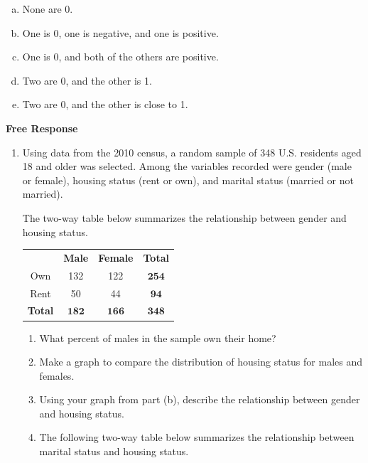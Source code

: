 \documentclass[a4paper,12pt,twoside]{book}
\begin{document}
\begin{enumerate}
        \begin{enumerate}[(a)]
            \item None are 0.
            \item One is 0, one is negative, and one is positive.
            \item One is 0, and both of the others are positive.
            \item Two are 0, and the other is 1.
            \item Two are 0, and the other is close to 1.
        \end{enumerate}
   \end{enumerate}
        \newpage    

    
    

\textbf{Free Response}

    \begin{enumerate}
        \item Using data from the 2010 census, a random sample of 348 U.S. residents aged 18 and older was selected. Among the variables recorded were gender (male or female), housing status (rent or own), and marital status (married or not married). 
        
        The two-way table below summarizes the relationship between gender and housing status.
        
        \begin{table}[H]
            \centering
            \begin{tabular}{cccc}
            \hline
            &\textbf{Male}&\textbf{Female}&\textbf{Total}\\
            Own&132&122&$\mathbf{254}$\\
            Rent&50&44&$\mathbf{94}$\\
            \textbf{Total}&$\mathbf{182}$&$\mathbf{166}$&$\mathbf{348}$\\
            \hline          
            \end{tabular}
        \end{table}
    
      \begin{enumerate}
          \item What percent of males in the sample own their home?
          \item Make a graph to compare the distribution of housing status for males and females. 
          \item Using your graph from part (b), describe the relationship between gender and housing status.
          \item The following two-way table below summarizes the relationship between marital status and housing status.
          

\end{enumerate}
\end{enumerate}
\end{document}
